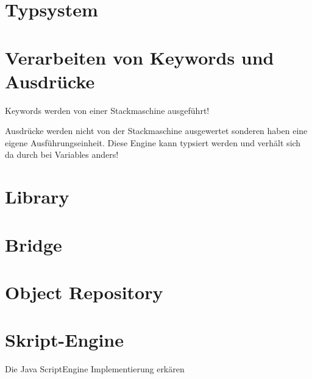 \section{Typsystem}

\todo

\section{Verarbeiten von Keywords und Ausdrücke}

Keywords werden von einer Stackmaschine ausgeführt!

Ausdrücke werden nicht von der Stackmaschine ausgewertet sonderen haben eine eigene Ausführungseinheit. 
Diese Engine kann typsiert werden und verhält sich da durch bei Variables anders!

\todo

\section{Library}

\todo

\section{Bridge}

\todo

\section{Object Repository}

\todo


\section{Skript-Engine}

Die Java ScriptEngine Implementierung erkären

\todo
